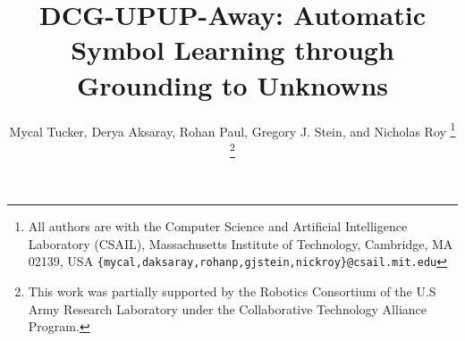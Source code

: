  

\title{DCG-UPUP-Away: Automatic Symbol Learning through Grounding to Unknowns}
\author{Mycal Tucker, Derya Aksaray, Rohan Paul, Gregory J. Stein, and Nicholas Roy%
\thanks{All authors are with the Computer Science and Artificial Intelligence Laboratory (CSAIL),
Massachusetts Institute of Technology, Cambridge, MA 02139, USA
\tt\footnotesize\{mycal,daksaray,rohanp,gjstein,nickroy\}@csail.mit.edu}%
\thanks{This work was partially supported by the Robotics Consortium of the U.S Army Research Laboratory under the Collaborative Technology Alliance Program.}%
}


\maketitle
\thispagestyle{empty}
\pagestyle{empty}

\begin{abstract}

\end{abstract}












